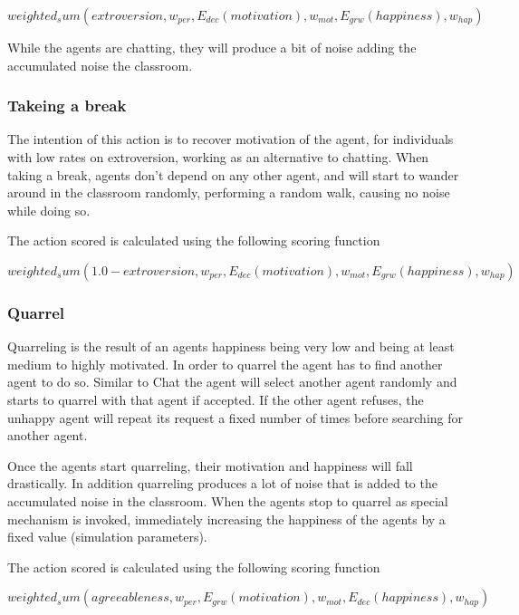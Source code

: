 \begin{equation}
    weighted_sum(extroversion, w_{per}, E_{dec}(motivation), w_{mot}, E_{grw}(happiness), w_{hap})
\end{equation}

While the agents are chatting, they will produce a bit of noise adding the
accumulated noise the classroom.

\subsubsection{Takeing a break}
The intention of this action is to recover motivation of the agent, for individuals
with low rates on extroversion, working as an alternative to chatting.
When taking a break, agents don't depend on any other agent, and will start to
wander around in the classroom randomly, performing a random walk, causing no noise
while doing so.

The action scored is calculated using the following scoring function

\begin{equation}
    weighted_sum(1.0 - extroversion, w_{per}, E_{dec}(motivation), w_{mot}, E_{grw}(happiness), w_{hap})
\end{equation}

\subsubsection{Quarrel}
Quarreling is the result of an agents happiness being very low and being at least
medium to highly motivated. In order to quarrel the agent has to find another agent
to do so. Similar to Chat the agent will select another agent randomly and starts
to quarrel with that agent if accepted. If the other agent refuses, the unhappy
agent will repeat its request a fixed number of times before searching for another agent.

Once the agents start quarreling, their motivation and happiness will fall drastically.
In addition quarreling produces a lot of noise that is added to the accumulated
noise in the classroom.
When the agents stop to quarrel as special mechanism is invoked, immediately
increasing the happiness of the agents by a fixed value (simulation parameters).

The action scored is calculated using the following scoring function

\begin{equation}
    weighted_sum(agreeableness, w_{per}, E_{grw}(motivation), w_{mot}, E_{dec}(happiness), w_{hap})
\end{equation}


